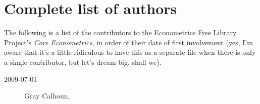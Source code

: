 

\chapter{Complete list of authors}

The following is a list of the contributors to the Econometrics Free
Library Project's \textit{Core Econometrics}, in order of
their date of first involvement (yes, I'm aware that it's a little
ridiculous to have this as a separate file when there is only a single
contributor, but let's dream big, shall we).

\begin{description}
\item[2009-07-01] Gray Calhoun, 
\end{description}

